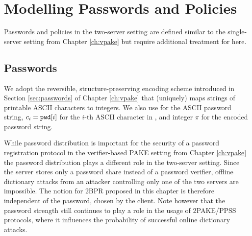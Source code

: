 \section{Modelling Passwords and Policies}
Passwords and policies in the two-server setting are defined similar to the single-server setting from Chapter \ref{ch:vpake} but require additional treatment for here.

\subsection{Passwords}
We adopt the reversible, structure-preserving encoding scheme introduced in Section \ref{sec:passwords} of Chapter \ref{ch:vpake} that (uniquely) maps strings of printable \ac{ASCII} characters to integers.
We also use \pwd for the \ac{ASCII} password string, $c_i=\mathtt{pwd}[i]$ for the $i$-th \ac{ASCII} character in \pwd, and integer $\pi$ for the encoded password string.

\begin{remark}\label{rem:passwords}
While password distribution is important for the security of a password registration protocol in the verifier-based PAKE setting from Chapter \ref{ch:vpake} the password distribution plays a different role in the two-server setting.
Since the server stores only a password share instead of a password verifier, offline dictionary attacks from an attacker controlling only one of the two servers are impossible.
The notion for \ac{2BPR} proposed in this chapter is therefore independent of the password, chosen by the client.
Note however that the password strength still continues to play a role in the usage of \ac{2PAKE}/\ac{PPSS} protocols, where it influences the probability of successful online dictionary attacks.
\end{remark}

